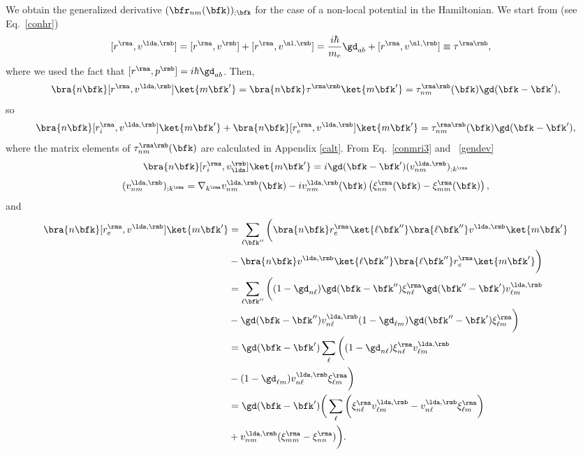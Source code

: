 We obtain the generalized derivative $(\bfr_{nm}(\bfk))_{;\bfk}$ for
the case of a non-local potential in the Hamiltonian.
We start from (see Eq.~\eqref{conhr})
\begin{align}\label{na_hrdab}
[r^{\rma},v^{\lda,\rmb}]
&=
[r^{\rma},v^\rmb]
+ 
[r^{\rma},v^{\nl,\rmb}]
=
\frac{i\hbar}{m_e}\gd_{ab}+
[r^{\rma},v^{\nl,\rmb}]
\equiv  
\tau^{\rma\rmb}
,
\end{align}  
where we used the fact that $[r^\rma,p^\rmb]=i\hbar\gd_{ab}$.
Then,
\begin{align}\label{na_hrdab2}
\bra{n\bfk}[r^{\rma},v^{\lda,\rmb}]\ket{m\bfk'}
=
\bra{n\bfk}\tau^{\rma\rmb}\ket{m\bfk'}
=
\tau^{\rma\rmb}_{nm}(\bfk)\gd(\bfk-\bfk')
,
\end{align}
so
\begin{align}\label{na_hrdab3}
\bra{n\bfk}[r^{\rma}_i,v^{\lda,\rmb}]\ket{m\bfk'}
+
\bra{n\bfk}[r^{\rma}_e,v^{\lda,\rmb}]\ket{m\bfk'}
=
\tau^{\rma\rmb}_{nm}(\bfk)\gd(\bfk-\bfk')
,
\end{align}
where the matrix elements of $\tau^{\rma\rmb}_{nm}(\bfk)$ are calculated in  
Appendix \ref{calt}.  
From Eq.~\eqref{conmri3} and ~\eqref{gendev}
\begin{align}\label{na_rip}
\bra{n\bfk}[r^{\rma}_i,v_\lda^{\rmb}]\ket{m\bfk'}
=i\gd(\bfk-\bfk')(v_{nm}^{\lda,\rmb})_{;k^{\rma}}
\end{align}
\begin{align}\label{na_ripn}
(v^{\lda,\rmb}_{nm})_{;k^{\rma}}=
\nabla_{k^{\rma}}
v^{\lda,\rmb}_{n m}(\bfk)
-
i
v^{\lda,\rmb}_{nm}(\bfk)
\left(
\xi^{\rma}_{nn}(\bfk)
-
\xi^{\rma}_{mm}(\bfk)
\right)
,
\end{align}
and
\begin{align}\label{na_rep}
\bra{n\bfk}[r^{\rma}_e,v^{\lda,\rmb}]\ket{m\bfk'}&=
\sum_{\ell\bfk''}
\bigg(
\bra{n\bfk}r^{\rma}_e\ket{\ell\bfk''}\bra{\ell\bfk''}v^{\lda,\rmb}\ket{m\bfk'}
\nonumber \\
&
-
\bra{n\bfk}v^{\lda,\rmb}\ket{\ell\bfk''}\bra{\ell\bfk''}r^{\rma}_e\ket{m\bfk'}
\bigg)
\nonumber \\
&=
\sum_{\ell\bfk''}
\bigg(
(1-\gd_{n\ell})\gd(\bfk-\bfk'')\xi^{\rma}_{n\ell}
\gd(\bfk''-\bfk')v^{\lda,\rmb}_{\ell m}
\nonumber \\
&-
\gd(\bfk-\bfk'')v^{\lda,\rmb}_{n\ell}
(1-\gd_{\ell m})\gd(\bfk''-\bfk')\xi^{\rma}_{\ell m}
\bigg)
\nonumber \\
&=
\gd(\bfk-\bfk')
\sum_{\ell}
\bigg(
(1-\gd_{n\ell})
\xi^{\rma}_{n\ell}
v^{\lda,\rmb}_{\ell m}
\nonumber \\
&-
(1-\gd_{\ell m})
v^{\lda,\rmb}_{n\ell}
\xi^{\rma}_{\ell m}
\bigg)
\nonumber \\
&=
\gd(\bfk-\bfk')
\bigg(
\sum_{\ell}
\bigg(
\xi^{\rma}_{n\ell}
v^{\lda,\rmb}_{\ell m}
-
v^{\lda,\rmb}_{n\ell}
\xi^{\rma}_{\ell m}
\bigg)
\nonumber \\
&+
v^{\lda,\rmb}_{nm}(\xi^{\rma}_{mm}
-
\xi^{\rma}_{nn}
)
\bigg)
.
\end{align}
